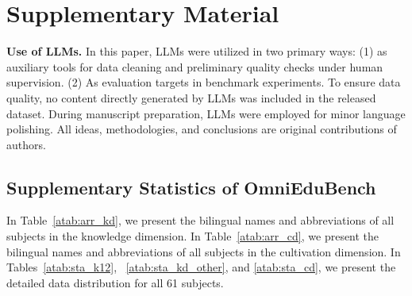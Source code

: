 \section{Supplementary Material}

\textbf{Use of LLMs.}
In this paper, LLMs were utilized in two primary ways: (1) as auxiliary tools for data cleaning and preliminary quality checks under human supervision. (2) As evaluation targets in benchmark experiments. To ensure data quality, no content directly generated by LLMs was included in the released dataset. During manuscript preparation, LLMs were employed for minor language polishing. All ideas, methodologies, and conclusions are original contributions of authors.

\subsection{Supplementary Statistics of OmniEduBench}

In Table~\ref{atab:arr_kd}, we present the bilingual names and abbreviations of all subjects in the knowledge dimension. 
In Table~\ref{atab:arr_cd}, we present the bilingual names and abbreviations of all subjects in the cultivation dimension.
In Tables~\ref{atab:sta_k12}, ~\ref{atab:sta_kd_other}, and \ref{atab:sta_cd}, we present the detailed data distribution for all 61 subjects.


